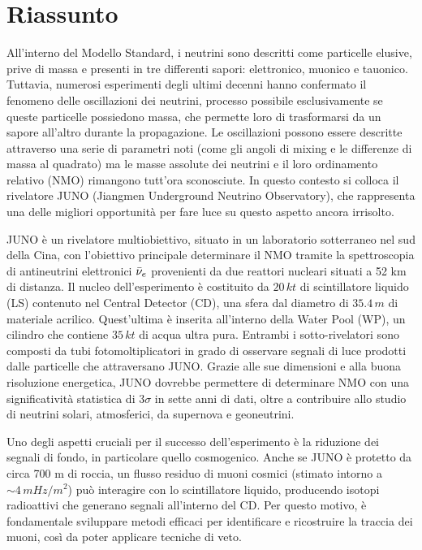 \chapter*{Riassunto}
All'interno del Modello Standard, i neutrini sono descritti come particelle elusive, prive di massa e presenti in tre differenti sapori: elettronico, muonico e tauonico. Tuttavia, numerosi esperimenti degli ultimi decenni hanno confermato il fenomeno delle oscillazioni dei neutrini, processo possibile esclusivamente se queste particelle possiedono massa, che permette loro di trasformarsi da un sapore all'altro durante la propagazione. Le oscillazioni possono essere descritte attraverso una serie di parametri noti (come gli angoli di mixing e le differenze di massa al quadrato) ma le masse assolute dei neutrini e il loro ordinamento relativo (NMO) rimangono tutt'ora sconosciute. In questo contesto si colloca il rivelatore JUNO (Jiangmen Underground Neutrino Observatory), che rappresenta una delle migliori opportunità per fare luce su questo aspetto ancora irrisolto.

JUNO è un rivelatore multiobiettivo, situato in un laboratorio sotterraneo nel sud della Cina, con l'obiettivo principale determinare il NMO tramite la spettroscopia di antineutrini elettronici $\Bar{\nu}_e$ provenienti da due reattori nucleari situati a 52 km di distanza. Il nucleo dell'esperimento è costituito da $20\,\unit{kt}$ di scintillatore liquido (LS) contenuto nel Central Detector (CD), una sfera dal diametro di $35.4\,\unit{m}$ di materiale acrilico. Quest'ultima è inserita all'interno della Water Pool (WP), un cilindro che contiene $35\,\unit{kt}$ di acqua ultra pura. Entrambi i sotto-rivelatori sono composti da tubi fotomoltiplicatori in grado di osservare segnali di luce prodotti dalle particelle che attraversano JUNO. Grazie alle sue dimensioni e alla buona risoluzione energetica, JUNO dovrebbe permettere di determinare NMO con una significatività statistica di $3\sigma$ in sette anni di dati, oltre a contribuire allo studio di neutrini solari, atmosferici, da supernova e geoneutrini.

Uno degli aspetti cruciali per il successo dell’esperimento è la riduzione dei segnali di fondo, in particolare quello cosmogenico. Anche se JUNO è protetto da circa 700 m di roccia, un flusso residuo di muoni cosmici (stimato intorno a $\sim4\,\unit{mHz/m^2}$) può interagire con lo scintillatore liquido, producendo isotopi radioattivi che generano segnali all'interno del CD. Per questo motivo, è fondamentale sviluppare metodi efficaci per identificare e ricostruire la traccia dei muoni, così da poter applicare tecniche di veto.

